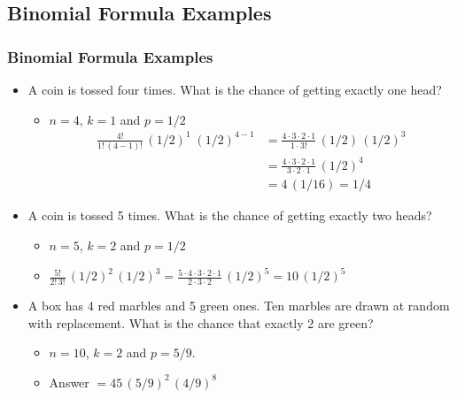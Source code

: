 \documentclass[t]{beamer}
\begin{document}
\subsection{Binomial Formula Examples}
\begin{frame}
\frametitle{Binomial Formula Examples}
{\small
\begin{itemize}
\item A coin is tossed four times.  What is the chance of getting exactly one head?\\
    \begin{itemize}
    \item \footnotesize $n=4$, $k=1$ and $p=1/2$\vspace{-4pt}
{\scriptsize\begin{align*}
\frac{4!}{1!\,(4-1)!}\,(1/2)^1\;(1/2)^{4-1} &= \frac{4\cdot 3\cdot 2\cdot 1}{1\cdot 3!}\,(1/2)\,(1/2)^3\\[2pt]
           & = \frac{4\cdot 3\cdot 2\cdot 1}{3\cdot 2\cdot 1}\,(1/2)^4\\[2pt] & =4\,(1/16)=1/4
\end{align*}}
    \end{itemize}
\item A coin is tossed 5 times.  What is the chance of getting exactly two heads?
    \begin{itemize}
    \item \footnotesize $n=5$, $k=2$ and $p=1/2$\\[2pt]
    \item \scriptsize $\displaystyle\frac{5!}{2!\,3!}\,(1/2)^2\,(1/2)^3 = \frac{5\cdot 4\cdot 3\cdot 2\cdot 1}{2\cdot 3\cdot 2}\,(1/2)^5 = 10\,(1/2)^5$
    \end{itemize}
\item A box has 4 red marbles and 5 green ones.  Ten marbles are drawn at random with replacement.
   What is the chance that exactly 2 are green?
  \begin{itemize}
  \item \footnotesize $n=10$, $k=2$ and $p=5/9$.\\[2pt]
  \item \footnotesize Answer $= 45\,(5/9)^2\,(4/9)^8$
  \end{itemize}
\end{itemize}
}
\label{lastpage}
\end{frame}
\end{document}
